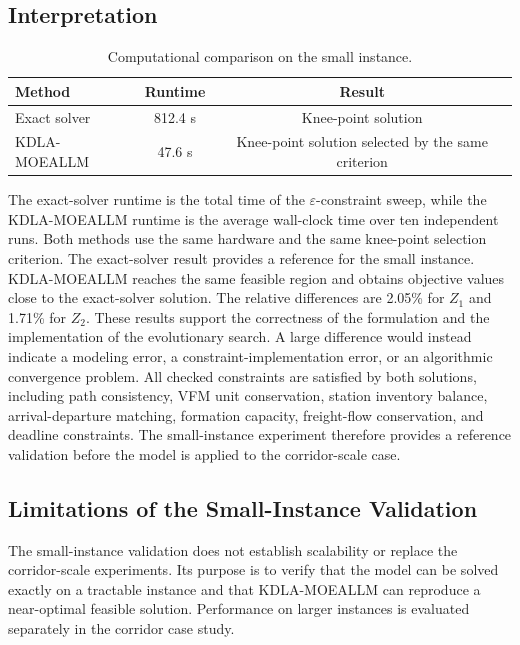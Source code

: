 \documentclass[11pt]{article}
\begin{document}
\subsection{Interpretation}
\begin{table}[!htbp]
	\centering
	\small
	\caption{Computational comparison on the small instance.}
\label{AppTab:runtime}
	\begin{tabular}{lcc}
		\toprule
		\textbf{Method} & \textbf{Runtime} & \textbf{Result} \\
		\midrule
		Exact solver & 812.4 s & Knee-point solution \\
		KDLA-MOEALLM & 47.6 s & Knee-point solution selected by the same criterion \\
		\bottomrule
	\end{tabular}
\end{table}


The exact-solver runtime is the total time of the $\varepsilon$-constraint sweep, while the KDLA-MOEALLM runtime is the average wall-clock time over ten independent runs. Both methods use the same hardware and the same knee-point selection criterion. The exact-solver result provides a reference for the small instance. KDLA-MOEALLM reaches the same feasible region and obtains objective values close to the exact-solver solution. The relative differences are 2.05\% for $Z_1$ and 1.71\% for $Z_2$. These results support the correctness of the formulation and the implementation of the evolutionary search. A large difference would instead indicate a modeling error, a constraint-implementation error, or an algorithmic convergence problem. All checked constraints are satisfied by both solutions, including path consistency, VFM unit conservation, station inventory balance, arrival-departure matching, formation capacity, freight-flow conservation, and deadline constraints. The small-instance experiment therefore provides a reference validation before the model is applied to the corridor-scale case.


\subsection{Limitations of the Small-Instance Validation}

The small-instance validation does not establish scalability or replace the corridor-scale experiments. Its purpose is to verify that the model can be solved exactly on a tractable instance and that KDLA-MOEALLM can reproduce a near-optimal feasible solution. Performance on larger instances is evaluated separately in the corridor case study.
\end{document}
